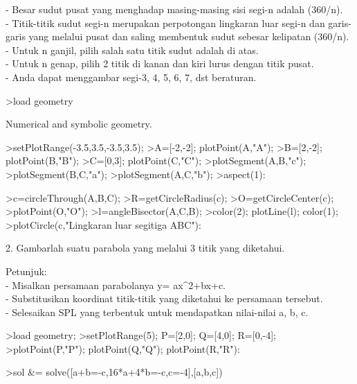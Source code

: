 \documentclass[a4paper,10pt]{article}
\begin{document}
\begin{eulernotebook}
\begin{eulercomment}
\begin{eulercomment}
\begin{eulercomment}
- Besar sudut pusat yang menghadap masing-masing sisi segi-n adalah
(360/n).\\
- Titik-titik sudut segi-n merupakan perpotongan lingkaran luar segi-n
dan garis-garis yang melalui pusat dan saling membentuk sudut sebesar
kelipatan (360/n).\\
- Untuk n ganjil, pilih salah satu titik sudut adalah di atas.\\
- Untuk n genap, pilih 2 titik di kanan dan kiri lurus dengan titik
pusat.\\
- Anda dapat menggambar segi-3, 4, 5, 6, 7, dst beraturan.
\end{eulercomment}
\begin{eulerprompt}
>load geometry
\end{eulerprompt}
\begin{euleroutput}
  Numerical and symbolic geometry.
\end{euleroutput}
\begin{eulerprompt}
>setPlotRange(-3.5,3.5,-3.5,3.5);
>A=[-2,-2]; plotPoint(A,"A");
>B=[2,-2]; plotPoint(B,"B");
>C=[0,3]; plotPoint(C,"C");
>plotSegment(A,B,"c");
>plotSegment(B,C,"a");
>plotSegment(A,C,"b");
>aspect(1):
\end{eulerprompt}
\begin{eulerprompt}
>c=circleThrough(A,B,C);
>R=getCircleRadius(c);
>O=getCircleCenter(c);
>plotPoint(O,"O");
>l=angleBisector(A,C,B);
>color(2); plotLine(l); color(1);
>plotCircle(c,"Lingkaran luar segitiga ABC"):
\end{eulerprompt}
\begin{eulercomment}
2. Gambarlah suatu parabola yang melalui 3 titik yang diketahui.

Petunjuk:\\
- Misalkan persamaan parabolanya y= ax\textasciicircum{}2+bx+c.\\
- Substitusikan koordinat titik-titik yang diketahui ke persamaan
tersebut.\\
- Selesaikan SPL yang terbentuk untuk mendapatkan nilai-nilai a, b, c.
\end{eulercomment}
\begin{eulerprompt}
>load geometry;
>setPlotRange(5); P=[2,0]; Q=[4,0]; R=[0,-4];
>plotPoint(P,"P"); plotPoint(Q,"Q"); plotPoint(R,"R"):
\end{eulerprompt}
\begin{eulerprompt}
>sol &= solve([a+b=-c,16*a+4*b=-c,c=-4],[a,b,c])
\end{eulerprompt}
\begin{euleroutput}
  

\end{euleroutput}
\end{eulercomment}
\end{eulercomment}
\end{eulernotebook}
\end{document}

